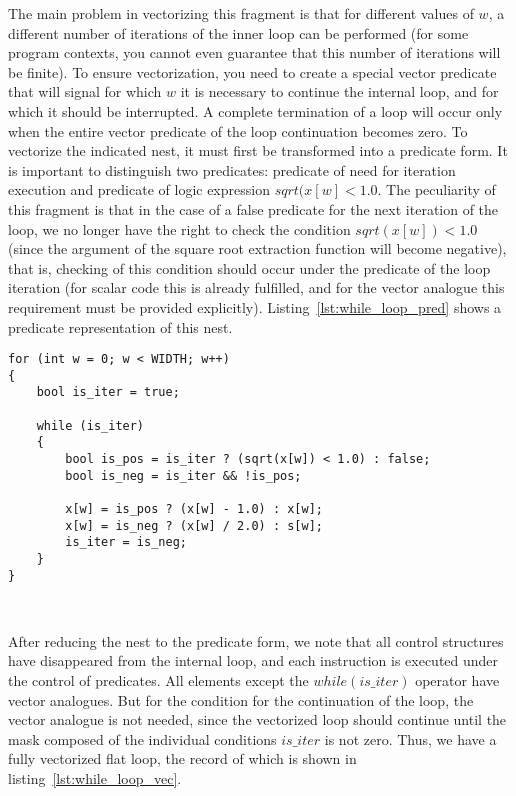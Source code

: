 \documentclass[
11pt,%
tightenlines,%
twoside,%
onecolumn,%
nofloats,%
nobibnotes,%
nofootinbib,%
superscriptaddress,%
noshowpacs,%
centertags]%
{revtex4}
\begin{document}
The main problem in vectorizing this fragment is that for different values of $w$, a different number of iterations of the inner loop can be performed (for some program contexts, you cannot even guarantee that this number of iterations will be finite).
To ensure vectorization, you need to create a special vector predicate that will signal for which $w$ it is necessary to continue the internal loop, and for which it should be interrupted.
A complete termination of a loop will occur only when the entire vector predicate of the loop continuation becomes zero.
To vectorize the indicated nest, it must first be transformed into a predicate form.
It is important to distinguish two predicates: predicate of need for iteration execution and predicate of logic expression $sqrt(x[w] < 1.0$.
The peculiarity of this fragment is that in the case of a false predicate for the next iteration of the loop, we no longer have the right to check the condition $sqrt (x [w]) <1.0$ (since the argument of the square root extraction function will become negative), that is, checking of this condition should occur under the predicate of the loop iteration (for scalar code this is already fulfilled, and for the vector analogue this requirement must be provided explicitly).
Listing~\ref{lst:while_loop_pred} shows a predicate representation of this nest.

\begin{lstlisting}[caption={The predicate form of a flat loop containing a loop with a non-constant number of iterations},label={lst:while_loop_pred}]
for (int w = 0; w < WIDTH; w++)
{
    bool is_iter = true;

    while (is_iter)
    {
        bool is_pos = is_iter ? (sqrt(x[w]) < 1.0) : false;
        bool is_neg = is_iter && !is_pos;    
    
        x[w] = is_pos ? (x[w] - 1.0) : x[w];
        x[w] = is_neg ? (x[w] / 2.0) : s[w];
        is_iter = is_neg;
    }
}
\end{lstlisting}

\

After reducing the nest to the predicate form, we note that all control structures have disappeared from the internal loop, and each instruction is executed under the control of predicates.
All elements except the $while (is \_iter)$ operator have vector analogues.
But for the condition for the continuation of the loop, the vector analogue is not needed, since the vectorized loop should continue until the mask composed of the individual conditions $is \_iter$ is not zero.
Thus, we have a fully vectorized flat loop, the record of which is shown in listing~\ref{lst:while_loop_vec}.
\end{document}
